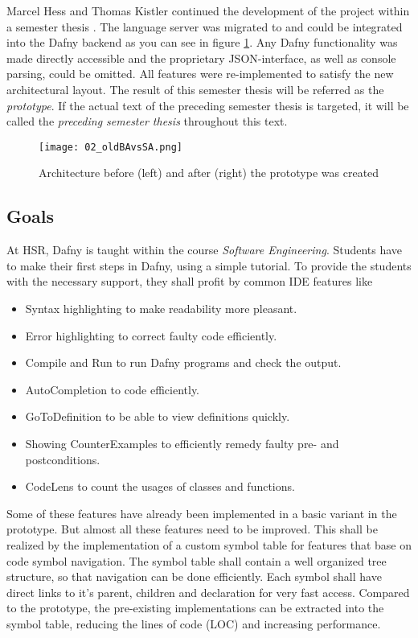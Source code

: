 Marcel Hess and Thomas Kistler continued the development of the project within a semester thesis \cite{sa}.
The language server was migrated to \CsharpWithSpace and could be integrated into the Dafny backend
as you can see in figure \ref{fig:oldBAvsSA_2}.
Any Dafny functionality was made directly accessible and the proprietary JSON-interface, as well as console parsing, could be omitted.
All features were re-implemented to satisfy the new architectural layout.
The result of this semester thesis will be referred as the \textit{prototype}. 
If the actual text of the preceding semester thesis is targeted, it will be called the \textit{preceding semester thesis} throughout this text. 

\begin{figure}[ht]
    \centering
    \texttt{[image: 02\_oldBAvsSA.png]}
    \caption{Architecture before (left) and after (right) the prototype was created}
    \label{fig:oldBAvsSA_2}
\end{figure}


\subsection{Goals}
At HSR, Dafny is taught within the course \textit{Software Engineering}.
Students have to make their first steps in Dafny, using a simple tutorial.
To provide the students with the necessary support, they shall profit by common IDE features like
\begin{itemize}
    \item Syntax highlighting to make readability more pleasant.
    \item Error highlighting to correct faulty code efficiently.
    \item Compile and Run to run Dafny programs and check the output.
    \item AutoCompletion to code efficiently.
    \item GoToDefinition to be able to view definitions quickly.
    \item Showing CounterExamples to efficiently remedy faulty pre- and postconditions.
    \item CodeLens to count the usages of classes and functions.
\end{itemize}

Some of these features have already been implemented in a basic variant in the prototype.
But almost all these features need to be improved.
This shall be realized by the implementation of a custom symbol table for features that base on code symbol navigation.
The symbol table shall contain a well organized tree structure, so that navigation can be done efficiently.
Each symbol shall have direct links to it's parent, children and declaration for very fast access.
Compared to the prototype, the pre-existing implementations can be extracted into the symbol table,
reducing the lines of code (LOC) and increasing performance.  \\

